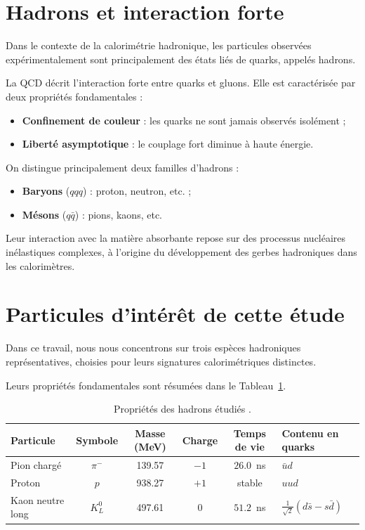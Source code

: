 \section{Hadrons et interaction forte}

Dans le contexte de la calorimétrie hadronique, les particules observées expérimentalement sont principalement des états liés de quarks, appelés hadrons.

La QCD décrit l'interaction forte entre quarks et gluons. Elle est caractérisée par deux propriétés fondamentales \cite{PeskinSchroeder1995} :

\begin{itemize}
    \item \textbf{Confinement de couleur} : les quarks ne sont jamais observés isolément ;
    \item \textbf{Liberté asymptotique} : le couplage fort diminue à haute énergie.
\end{itemize}

On distingue principalement deux familles d'hadrons \cite{pdg2024} :

\begin{itemize}
    \item \textbf{Baryons} (\(qqq\)) : proton, neutron, etc. ;
    \item \textbf{Mésons} (\(q\bar{q}\)) : pions, kaons, etc.
\end{itemize}

Leur interaction avec la matière absorbante repose sur des processus nucléaires inélastiques complexes, à l'origine du développement des gerbes hadroniques dans les calorimètres.

\section{Particules d'intérêt de cette étude}

Dans ce travail, nous nous concentrons sur trois espèces hadroniques représentatives, choisies pour leurs signatures calorimétriques distinctes.

Leurs propriétés fondamentales sont résumées dans le Tableau~\ref{tab:hadrons}.

\begin{table}[!ht]
    \centering
    \caption{Propriétés des hadrons étudiés \cite{pdg2024}.}
    \label{tab:hadrons}
    \begin{tabular}{lccccl}
        \hline
        \textbf{Particule} & \textbf{Symbole} & \textbf{Masse (MeV)} &
        \textbf{Charge} & \textbf{Temps de vie} & \textbf{Contenu en quarks} \\
        \hline
        Pion chargé  & \(\pi^-\)  & 139.57  & \(-1\) & \(26.0\)~ns   & \(\bar{u}d\)                        \\
        Proton       & \(p\)      & 938.27  & \(+1\) & stable        & \(uud\)                             \\
        Kaon neutre long & \(K^0_L\) & 497.61 & \(0\) & \(51.2\)~ns  & \(\frac{1}{\sqrt{2}}(d\bar{s}-s\bar{d})\) \\
        \hline
    \end{tabular}
\end{table}

